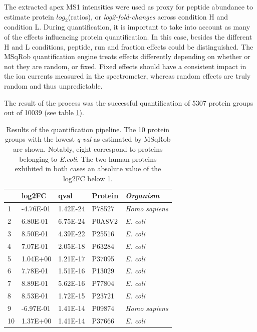 \documentclass[11pt, a4paper]{report}
\begin{document}
The extracted apex MS1 intensities were used as proxy for peptide abundance to estimate protein $log_2$(ratios), or \textit{log2-fold-changes} across condition H and condition L. During quantification, it is important to take into account as many of the effects influencing protein quantification. In this case, besides the different H and L conditions, peptide, run and fraction effects could be distinguished. The MSqRob quantification engine treats effects differently depending on whether or not they are random, or fixed. Fixed effects should have a consistent impact in the ion currents measured in the spectrometer, whereas random effects are truly random and thus unpredictable.

The result of the process was the successful quantification of 5307 protein groups out of 10039 (see table \ref{tab:quantification_table}).

\begin{table}[ht]
\centering
\begin{tabular}{llll>{\itshape}l}
  \toprule
 & \ac{log2FC} & qval & Protein & Organism \\ 
  \midrule
1 & -4.76E-01 & 1.42E-24 & P78527 & Homo sapiens \\ 
   \rowcolor[gray]{0.95}2 & 6.80E-01 & 6.75E-24 & P0A8V2 & E. coli \\ 
  3 & 8.50E-01 & 4.39E-22 & P25516 & E. coli \\ 
   \rowcolor[gray]{0.95}4 & 7.07E-01 & 2.05E-18 & P63284 & E. coli \\ 
  5 & 1.04E+00 & 1.21E-17 & P37095 & E. coli \\ 
   \rowcolor[gray]{0.95}6 & 7.78E-01 & 1.51E-16 & P13029 & E. coli \\ 
  7 & 8.89E-01 & 5.62E-16 & P77804 & E. coli \\ 
   \rowcolor[gray]{0.95}8 & 8.53E-01 & 1.72E-15 & P23721 & E. coli \\ 
  9 & -6.97E-01 & 1.41E-14 & P09874 & Homo sapiens \\ 
   \rowcolor[gray]{0.95}10 & 1.37E+00 & 1.41E-14 & P37666 & E. coli \\ 
   \bottomrule
\end{tabular}
\caption{Results of the quantification pipeline. The 10 protein groups with the lowest \textit{q-val}  as estimated by MSqRob are shown. Notably, eight correspond to proteins belonging to \textit{E.coli}. The two human proteins exhibited in both cases an absolute value of the \ac{log2FC} below 1.}
\label{tab:quantification_table}
\end{table}
\end{document}
